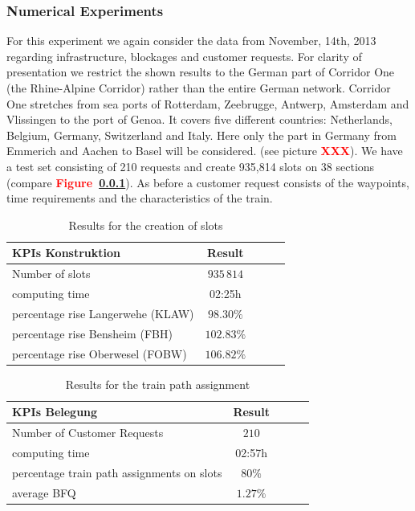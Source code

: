 \subsubsection{Numerical Experiments}
For this experiment we again consider the data from November, 14th, 2013 regarding infrastructure, blockages and customer requests. For clarity of presentation we restrict the shown results to the German part of Corridor One (the Rhine-Alpine Corridor) \cite{} rather than the entire German network. Corridor One stretches from sea ports of Rotterdam, Zeebrugge, Antwerp, Amsterdam and Vlissingen to the port of Genoa. It covers five different countries: Netherlands, Belgium, Germany, Switzerland and Italy. Here only the part in Germany from Emmerich and Aachen to Basel will be considered. (see picture \textbf{\textcolor{red}{XXX}}). We have a test set consisting of 210 requests and create 935,814 slots on 38 sections (compare \textbf{\textcolor{red}{Figure~\ref{}}}).
As before a customer request consists of the waypoints, time requirements and the characteristics of the train.


\begin{table}[h]
	\centering
	\caption{Results for the creation of slots}
	\label{tab:result_Netzfpl}
	\begin{tabular}{lcccc} \hline
		\textbf{KPIs Konstruktion}   & \textbf{Result}  \\ \hline
		Number of slots             & $935\,814$                      \\
		computing time       & 02:25h                     \\
		percentage rise Langerwehe (KLAW)   & $98.30\%$                       \\
		percentage rise Bensheim (FBH) & $102.83\%$                       \\
		percentage rise Oberwesel (FOBW) & $106.82\%$                     \\ \hline
	\end{tabular}
\end{table}
\par

\begin{table}[h]
	\centering
	\caption{Results for the train path assignment}
	\label{tab:result_Netzfpl_Bel}
	\begin{tabular}{lcccc} \hline
		\textbf{KPIs Belegung}   & \textbf{Result}  \\ \hline
		Number of Customer Requests             & $210$                      \\
		computing time       & 02:57h                     \\
		percentage train path assignments on slots   & $80\%$                       \\
		average BFQ & $1.27\%$                             \\ \hline
	\end{tabular}
\end{table}
\par

